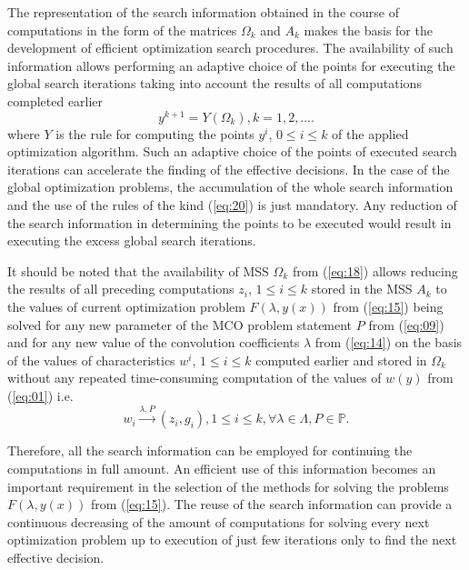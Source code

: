 \documentclass{svproc}
\begin{document}
The representation of the search information obtained in the course of computations in the form of  the matrices $\Omega_k$ and $A_k$ makes the basis for the development of efficient optimization search procedures. The availability of such information allows performing an adaptive choice of the points for executing the global search iterations taking into account the results of all computations completed earlier 
\begin{equation}
\label{eq:20}
y^{k+1}=Y(\Omega_k),k=1,2,\dots.
\end{equation}
where $Y$ is the rule for computing the points $y^i$, $0 \leq i \leq k$ of the applied optimization algorithm. Such an adaptive choice of the points of executed search iterations can accelerate the finding of the effective decisions. In the case of the global optimization problems, the accumulation of the whole search information and the use of the rules of the kind (\ref{eq:20}) is just mandatory. Any reduction of the search information in determining the points to be executed would result in executing the excess global search iterations.

It should be noted that the availability of MSS $\Omega_k$ from (\ref{eq:18}) allows reducing the results of all preceding computations $z_i$,  $1 \leq i \leq k$ stored in the MSS $A_k$ to the values of current optimization problem $F(\lambda,y(x))$ from (\ref{eq:15}) being solved for any new parameter of the MCO problem statement $P$ from (\ref{eq:09}) and for any new value of the convolution coefficients $\lambda$ from (\ref{eq:14}) on the basis of the values of characteristics $w^i$, $1 \leq i \leq k$ computed earlier and stored in $\Omega_k$ without any repeated time-consuming computation of the values of $w(y)$ from (\ref{eq:01}) i.e.
\begin{equation}
\label{eq:21}
w_i \xrightarrow{\lambda,P} (z_i,g_i ), 1 \leq i \leq k,\forall \lambda \in \Lambda, P \in \mathbb{P}.
\end{equation}

Therefore, all the search information can be employed for continuing the computations in full amount. An efficient use of this information becomes an important requirement in the selection of the methods for solving the problems $F(\lambda,y(x))$ from (\ref{eq:15}). The reuse of the search information can provide a continuous decreasing of the amount of computations for solving every next optimization problem up to execution of just few iterations only to find the next effective decision.
\end{document}
